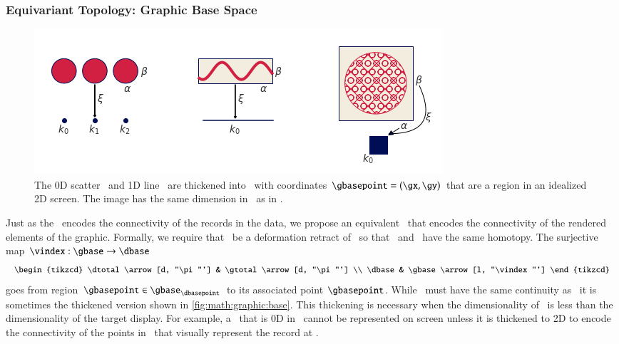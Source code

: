 \documentclass[journal]{vgtc}                %
\begin{document}
\subsubsection{Equivariant Topology: Graphic Base Space}
\label{sec:math:graphic:base}
\begin{figure}[htb]
  \centering %
  \includegraphics[width=\columnwidth]{retraction_maps.png}
  \caption{The 0D scatter \dbasepoint\ and 1D line \dbasepoint\ are thickened into \gbase\ with coordinates $\gbasepoint=(\gx, \gy)$ that are a region in an idealized 2D screen. The image has the same dimension in \gbase\ as in \dbase.}
  \label{fig:math:graphic:base}
 \end{figure}

Just as the \dbase\ encodes the connectivity of the records in the data, we propose an equivalent \gbase\ that encodes the connectivity of the rendered elements of the graphic. Formally, we require that \dbase\ be a deformation retract\cite{RetractionTopology2020} of \gbase\ so that \dbase\ and \gbase\ have the same homotopy. The surjective map $\vindex: \gbase \rightarrow \dbase$ 
\begin{equation}
    \begin{tikzcd}
        \dtotal \arrow[d, "\pi"'] & \gtotal \arrow[d, "\pi"'] \\
        \dbase                   & \gbase \arrow[l, "\vindex"']
    \end{tikzcd}
\end{equation}
goes from region $\gbasepoint \in \gbase_{\dbasepoint}$ to its associated point $\gbasepoint$. While \gbase\ must have the same continuity as \dbase\, it is sometimes the  thickened version shown in \autoref{fig:math:graphic:base}. This thickening is necessary when the dimensionality of \dbase\ is less than the dimensionality of the target display. For example, a \dbasepoint\ that is 0D in \dbase\ cannot be represented on screen unless it is thickened to 2D to encode the connectivity of the points in \gfiber\ that visually represent the record at \dbasepoint. 
\end{document}
